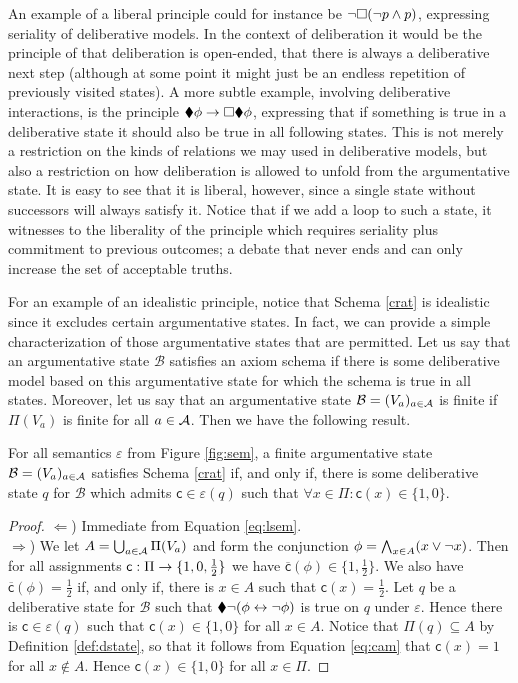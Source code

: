 \documentclass[greybox]{svmult}
\renewcommand{\bar}[1]{\overline{#1}}
\newcommand{\clab}{\mathsf c}
\newcommand{\views}{\mathcal B}
\newcommand{\sem}{\varepsilon}
\begin{document}
An example of a liberal principle could for instance be $\neg \square (\neg p \land p)$, expressing seriality of deliberative models. In the context of deliberation it would be the principle of that deliberation is open-ended, that there is always a deliberative next step (although at some point it might just be an endless repetition of previously visited states). A more subtle example, involving deliberative interactions, is the principle $\blacklozenge \phi \to \square \blacklozenge \phi$, expressing that if something is true in a deliberative state it should also be true in all following states. This is not merely a restriction on the kinds of relations we may used in deliberative models, but also a restriction on how deliberation is allowed to unfold from the argumentative state. It is easy to see that it is liberal, however, since a single state without successors will always satisfy it. Notice that if we add a loop to such a state, it witnesses to the liberality of the principle which requires seriality plus commitment to previous outcomes; a debate that never ends and can only increase the set of acceptable truths.

For an example of an idealistic principle, notice that Schema \ref{crat} is idealistic since it excludes certain argumentative states. In fact, we can provide a simple characterization of those argumentative states that are permitted. Let us say that an argumentative state $\views$ satisfies an axiom schema if there is some deliberative model based on this argumentative state for which the schema is true in all states. Moreover, let us say that an argumentative state $\views = (V_a)_{a \in \agents}$ is finite if $\Pi(V_a)$ is finite for all $a \in \mathcal A$. Then we have the following result.

\begin{theorem}\label{thm:1}
For all semantics $\sem$ from Figure \ref{fig:sem}, a finite argumentative state $\views = (V_a)_{a \in \agents}$ satisfies Schema \ref{crat} if, and only if, there is some deliberative state $q$ for $\views$ which admits $\clab \in \sem(q)$ such that $\forall x \in \Pi: \clab(x) \in \{1,0\}$.
\end{theorem}

\begin{proof}
$\Leftarrow$) Immediate from Equation \ref{eq:lsem}. \\
$\Rightarrow$) We let $A = \bigcup_{a \in \mathcal A}\Pi(V_a)$ and form the conjunction $\phi = \bigwedge_{x \in A}(x \lor \neg x)$. Then for all assignments $\clab: \Pi \to \three$ we have $\bar \clab(\phi) \in \{1,\frac{1}{2}\}$. We also have $\bar \clab(\phi) = \frac{1}{2}$ if, and only if, there is $x \in A$ such that $\clab(x) = \frac{1}{2}$. Let $q$ be a deliberative state for $\views$ such that $\blacklozenge \neg (\phi \leftrightarrow \neg \phi)$ is true on $q$ under $\sem$. Hence there is $\clab \in \sem(q)$ such that $\clab(x) \in \{1,0\}$ for all $x \in A$. Notice that $\Pi(q) \subseteq A$ by Definition \ref{def:dstate}, so that it follows from Equation \ref{eq:cam} that $\clab(x) = 1$ for all $x \not \in A$. Hence $\clab(x) \in \{1,0\}$ for all $x \in \Pi$.
\end{proof}
\end{document}
